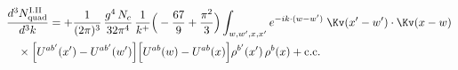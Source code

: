 \begin{align}\label{eq:H-I.II-2o}
&\frac{d^{3}N^{\rm I.II}_{{\rm quad}}}{d^{3}k}=+\frac{1}{(2\pi)^{3}}\, \frac{g^{4}\,N_{c}}{32\pi^{4}}\, \frac{1}{k^{+}}\Big(-\frac{67}{9}+\frac{\pi^{2}}{3}\Big) \int_{w,w',x,x'} e^{-ik\cdot(w-w')}\;\Kv(x'-w')\cdot\Kv(x-w)\notag\\
&\quad \times\Big[U^{ab'}(x')-U^{ab'}(w')\Big]\Big[U^{ab}(w)-U^{ab}(x)\Big]\rho^{b'}(x')\, \rho^{b}(x) + {\rm c.c.}
\end{align}
